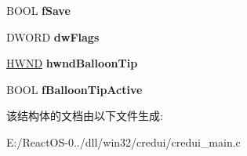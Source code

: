 \begin{DoxyCompactItemize}
B\+O\+OL {\bfseries f\+Save}
\item 
\mbox{\label{structcred__dialog__params_a50fdbff39eb0585c66df06afd83db52d}} 
D\+W\+O\+RD {\bfseries dw\+Flags}
\item 
\mbox{\label{structcred__dialog__params_a1b22ff899217598c432a06226f04b90a}} 
\hyperlink{interfacevoid}{H\+W\+ND} {\bfseries hwnd\+Balloon\+Tip}
\item 
\mbox{\label{structcred__dialog__params_a277311dd78aace06235e71622d171201}} 
B\+O\+OL {\bfseries f\+Balloon\+Tip\+Active}
\end{DoxyCompactItemize}


该结构体的文档由以下文件生成\+:\begin{DoxyCompactItemize}
\item 
E\+:/\+React\+O\+S-\/0../dll/win32/credui/credui\+\_\+main.\+c\end{DoxyCompactItemize}
